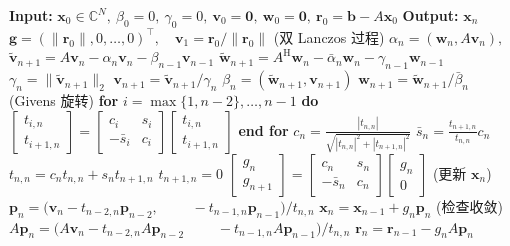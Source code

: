 \begin{algorithm}[H]\caption{{QMR 方法}}\label{alg:qmr}\begin{algorithmic}[1]
\Statex\textbf{Input:} $\bm x_0\in\mathbb C^N,\ \beta_0=0,\ \gamma_0=0,\ \bm v_0=\bm0,\ \bm w_0=\bm0,\ \bm r_0=\bm b-A\bm x_0$
\Statex\textbf{Output:} $\bm x_n$
\State $\bm g=(\|\bm r_0\|,0,\ldots,0)^{\top},\quad\bm v_1=\bm r_0/\|\bm r_0\|$
\State ({双 Lanczos 过程})
\State $\alpha_n=(\bm w_n,A\bm v_n),$
\State $\widetilde{\bm v}_{n+1}=A\bm v_n-\alpha_n\bm v_n-\beta_{n-1}\bm v_{n-1}$
\State $\widetilde{\bm w}_{n+1}=A^{\mathrm H}\bm w_n-\bar\alpha_n\bm w_n-\gamma_{n-1}\bm w_{n-1}$
\State $\gamma_n=\|\widetilde{\bm v}_{n+1}\|_2$
\State $\bm v_{n+1}=\widetilde{\bm v}_{n+1}/\gamma_n$
\State $\beta_n=(\widetilde{\bm w}_{n+1},\bm v_{n+1})$
\State $\bm w_{n+1}=\widetilde{\bm w}_{n+1}/\bar\beta_n$
\State (Givens {旋转})
\State \textbf{for} $i=\max\{1,n-2\},\ldots,n-1$ \textbf{do}
\State $\begin{bmatrix}t_{i,n}\\t_{i+1,n}\end{bmatrix}=\begin{bmatrix}c_i&s_i\\-\bar s_i&c_i\end{bmatrix}\begin{bmatrix}t_{i,n}\\t_{i+1,n}\end{bmatrix}$
\State \textbf{end for}
\State $c_n=\frac{|t_{n,n}|}{\sqrt{|t_{n,n}|^2+|t_{n+1,n}|^2}}$
\State $\bar s_n=\frac{t_{n+1,n}}{t_{n,n}}c_n$
\State $t_{n,n}=c_nt_{n,n}+s_nt_{n+1,n}$
\State $t_{n+1,n}=0$
\State $\begin{bmatrix}g_n\\g_{n+1}\end{bmatrix}=\begin{bmatrix}c_n&s_n\\-\bar s_n&c_n\end{bmatrix}\begin{bmatrix}g_n\\0\end{bmatrix}$
\State ({更新} $\bm x_n$)
\State $\bm p_n=(\bm v_n-t_{n-2,n}\bm p_{n-2},$
\State $\qquad-t_{n-1,n}\bm p_{n-1})/t_{n,n}$
\State $\bm x_n=\bm x_{n-1}+g_n\bm p_n$
\State ({检查收敛})
\State $A\bm p_n=(A\bm v_n-t_{n-2,n}A\bm p_{n-2}$
\State $\qquad-t_{n-1,n}A\bm p_{n-1})/t_{n,n}$
\State $\bm r_n=\bm r_{n-1}-g_nA\bm p_n$
\EndFor\end{algorithmic}\end{algorithm}
